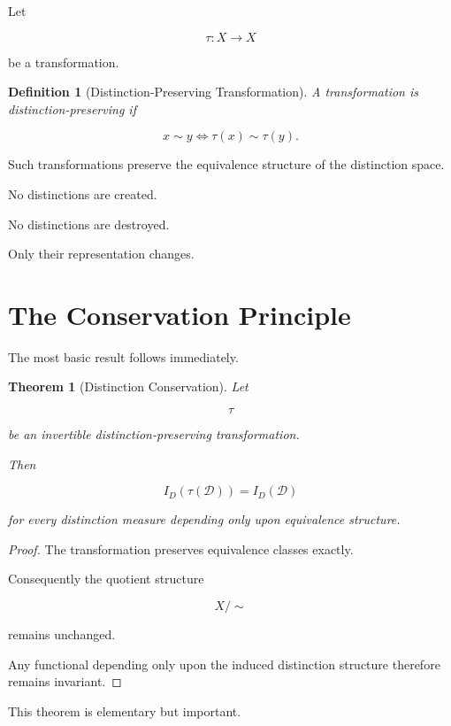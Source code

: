 \documentclass[11pt,oneside,openany]{book}
\newtheorem{definition}{Definition}[chapter] \newtheorem{theorem}{Theorem}[chapter] \newtheorem{proposition}{Proposition}[chapter] \newtheorem{lemma}{Lemma}[chapter] \newtheorem{corollary}{Corollary}[chapter] \newtheorem{remark}{Remark}[chapter]
\begin{document}
Let

\[
\tau:X\rightarrow X
\]

be a transformation.

\begin{definition}[Distinction-Preserving Transformation]

A transformation is distinction-preserving if

\[
x\sim y
\Longleftrightarrow
\tau(x)\sim\tau(y).
\]

\end{definition}

Such transformations preserve the equivalence structure of the distinction space.

No distinctions are created.

No distinctions are destroyed.

Only their representation changes.

\section{The Conservation Principle}

The most basic result follows immediately.

\begin{theorem}[Distinction Conservation]

Let

\[
\tau
\]

be an invertible distinction-preserving transformation.

Then

\[
I_D(\tau(\mathcal D))
=
I_D(\mathcal D)
\]

for every distinction measure depending only upon equivalence structure.

\end{theorem}

\begin{proof}

The transformation preserves equivalence classes exactly.

Consequently the quotient structure

\[
X/\!\sim
\]

remains unchanged.

Any functional depending only upon the induced distinction structure therefore remains invariant.

\end{proof}

This theorem is elementary but important.
\end{document}
